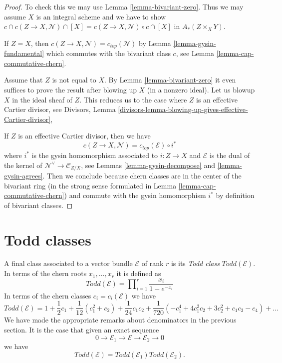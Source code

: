 \begin{proof}
To check this we may use Lemma \ref{lemma-bivariant-zero}.
Thus we may assume $X$ is an integral scheme and we have to show
$c \cap c(Z \to X, \mathcal{N}) \cap [X] =
c(Z \to X, \mathcal{N}) \circ c \cap [X]$ in $A_*(Z \times_X Y)$.

\medskip\noindent
If $Z = X$, then $c(Z \to X, \mathcal{N}) = c_{top}(\mathcal{N})$ by
Lemma \ref{lemma-gysin-fundamental} which commutes
with the bivariant class $c$, see Lemma \ref{lemma-cap-commutative-chern}.

\medskip\noindent
Assume that $Z$ is not equal to $X$. By Lemma \ref{lemma-bivariant-zero}
it even suffices to prove the result after blowing up $X$ (in a nonzero ideal).
Let us blowup $X$ in the ideal sheaf of $Z$. This reduces us to the case
where $Z$ is an effective Cartier divisor, see
Divisors, Lemma
\ref{divisors-lemma-blowing-up-gives-effective-Cartier-divisor},

\medskip\noindent
If $Z$ is an effective Cartier divisor, then we have
$$
c(Z \to X, \mathcal{N}) =
c_{top}(\mathcal{E}) \circ i^*
$$
where $i^*$ is the gysin homomorphism associated to $i : Z \to X$
and $\mathcal{E}$ is the dual of the kernel of
$\mathcal{N}^\vee \to \mathcal{C}_{Z/X}$, see
Lemmas \ref{lemma-gysin-decompose} and \ref{lemma-gysin-agrees}.
Then we conclude because chern classes are in the center of the
bivariant ring (in the strong sense formulated in
Lemma \ref{lemma-cap-commutative-chern}) and commute
with the gysin homomorphism $i^*$ by definition of bivariant classes.
\end{proof}













\section{Todd classes}
\label{section-todd-classes}

\noindent
A final class associated to a vector bundle $\mathcal{E}$
of rank $r$ is its {\it Todd class} $Todd(\mathcal{E})$.
In terms of the chern roots $x_1, \ldots, x_r$ it is
defined as
$$
Todd(\mathcal{E})
=
\prod\nolimits_{i = 1}^r
\frac{x_i}{1 - e^{-x_i}}
$$
In terms of the chern classes $c_i = c_i(\mathcal{E})$
we have
$$
Todd(\mathcal{E})
=
1
+
\frac{1}{2}c_1
+
\frac{1}{12}(c_1^2 + c_2)
+
\frac{1}{24}c_1c_2
+
\frac{1}{720}(-c_1^4 + 4c_1^2c_2 + 3c_2^2 + c_1c_3 - c_4)
+
\ldots
$$
We have made the appropriate remarks about denominators
in the previous section. It is the case that
given an exact sequence
$$
0
\to
{\mathcal E}_1
\to
{\mathcal E}
\to
{\mathcal E}_2
\to
0
$$
we have
$$
Todd({\mathcal E}) = Todd({\mathcal E}_1) Todd({\mathcal E}_2).
$$




